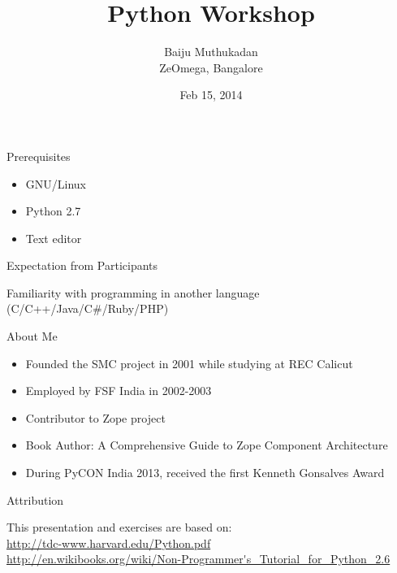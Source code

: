 \documentclass[12pt,handout]{beamer}
\title[Python Workshop]{Python Workshop}
\author{Baiju Muthukadan \\ ZeOmega, Bangalore}
\institute{FOSSMeet'14, NIT Calicut}
\date{Feb 15, 2014}
\begin{document}
\begin{frame}
\titlepage
\end{frame}


\begin{frame}{Prerequisites}
\begin{itemize}
\item GNU/Linux
\item Python 2.7
\item Text editor
\end{itemize}
\end{frame}

\begin{frame}{Expectation from Participants}

\center \Large{Familiarity with programming in another language (C/C++/Java/C\#/Ruby/PHP)}

\end{frame}

\begin{frame}{About Me}

\begin{itemize}
\item Founded the SMC project in 2001 while studying at REC Calicut
\item Employed by FSF India in 2002-2003
\item Contributor to Zope project
\item Book Author: A Comprehensive Guide to Zope Component Architecture
\item During PyCON India 2013, received the first Kenneth Gonsalves Award
\end{itemize}

\end{frame}

\begin{frame}{Attribution}

This presentation and exercises are based on:
\\[.5cm]
\url{http://tdc-www.harvard.edu/Python.pdf}
\\
\url{http://en.wikibooks.org/wiki/Non-Programmer's_Tutorial_for_Python_2.6}

\end{frame}
\end{document}
